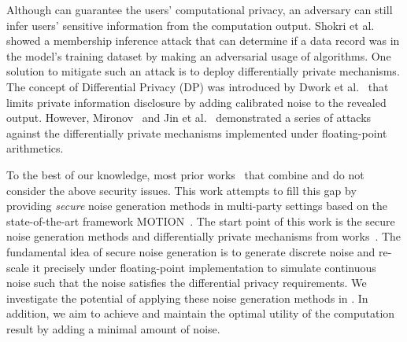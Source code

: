 Although \smpc can guarantee the users' computational privacy, an adversary can still infer users' sensitive information from the computation output. Shokri et al.~\cite{shokri2017membership} showed a membership inference attack that can determine if a data record was in the model's training dataset by making an adversarial usage of \machinelearning algorithms. One solution to mitigate such an attack is to deploy differentially private mechanisms. The concept of Differential Privacy (DP) was introduced by Dwork et al.~\cite{dwork2006differential, dwork2006calibrating} that limits private information disclosure by adding calibrated noise to the revealed output.
However, Mironov~\cite{mironov2012significance} and Jin et al.~\cite{jin2022we} demonstrated a series of attacks against the differentially private mechanisms implemented under floating-point arithmetics.

To the best of our knowledge, most prior works~\cite{rastogi2010differentially,Elaine2011Privacy,acs2011have,chan2012privacy,eigner2014differentially,wu2016inherit,bindschaedler2017achieving,jayaraman2018distributed,truex2019hybrid,knott2021crypten,yuan2021practical} that combine \smpc and \differentialprivacy do not consider the above security issues.
This work attempts to fill this gap by providing \textit{secure} noise generation methods in multi-party settings based on the state-of-the-art \smpc framework MOTION~\cite{braun2022motion}.
The start point of this work is the secure noise generation methods and differentially private mechanisms from works~\cite{mironov2012significance,googleDP2019,canonne2020discrete}.
The fundamental idea of secure noise generation is to generate discrete noise and re-scale it precisely under floating-point implementation to simulate continuous noise such that the noise satisfies the differential privacy requirements.
We investigate the potential of applying these noise generation methods in \smpc.
In addition, we aim to achieve \differentialprivacy and maintain the optimal utility of the computation result by adding a minimal amount of noise.

